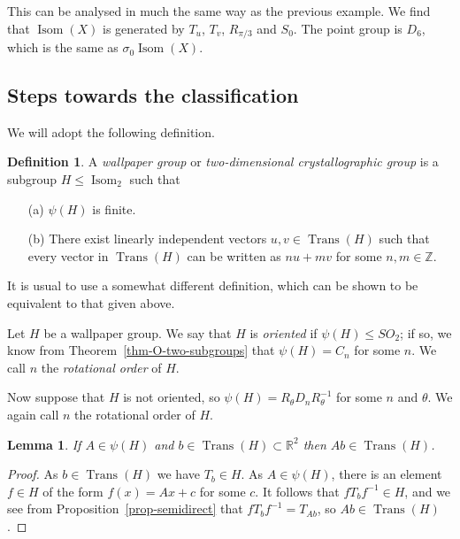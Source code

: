 \documentclass{amsart}
\DeclareMathOperator{\Trans}    {Trans}
\DeclareMathOperator{\Isom}     {Isom}
\newcommand{\Z}         {{\mathbb{Z}}}
\newcommand{\R}         {{\mathbb{R}}}
\newcommand{\sg}        {\sigma}
\renewcommand{\:}{\colon}
\newtheorem{lemma}[theorem]{Lemma}
\theoremstyle{definition}
\newtheorem{definition}[theorem]{Definition}
\begin{document}
This can be analysed in much the same way as the previous example.  We
find that $\Isom(X)$ is generated by $T_u$, $T_v$, $R_{\pi/3}$ and $S_0$.
The point group is $D_6$, which is the same as $\sg_0\Isom(X)$.

\subsection{Steps towards the classification}

We will adopt the following definition.
\begin{definition}\label{defn-wallpaper}
 A \emph{wallpaper group} or \emph{two-dimensional crystallographic
 group} is a subgroup $H\leq \Isom_2$ such that
 \begin{itemize}
  \item[(a)] $\psi(H)$ is finite.
  \item[(b)] There exist linearly independent vectors $u,v\in \Trans(H)$
   such that every vector in $\Trans(H)$ can be written as $nu+mv$ for some
   $n,m\in\Z$.
 \end{itemize}
\end{definition}
It is usual to use a somewhat different definition, which can be shown
to be equivalent to that given above.

Let $H$ be a wallpaper group.  We say that $H$ is \emph{oriented} if
$\psi(H)\leq SO_2$; if so, we know from
Theorem~\ref{thm-O-two-subgroups} that $\psi(H)=C_n$ for some $n$.  We
call $n$ the \emph{rotational order} of $H$.

Now suppose that $H$ is not oriented, so
$\psi(H)=R_\theta D_n R_\theta^{-1}$ for some $n$ and $\theta$.  We again
call $n$ the rotational order of $H$.

\begin{lemma}\label{lem-psi-T}
 If $A\in\psi(H)$ and $b\in \Trans(H)\subset\R^2$ then $Ab\in \Trans(H)$.
\end{lemma}
\begin{proof}
 As $b\in \Trans(H)$ we have $T_b\in H$.  As $A\in\psi(H)$, there is an
 element $f\in H$ of the form $f(x)=Ax+c$ for some $c$.  It follows
 that $fT_bf^{-1}\in H$, and we see from
 Proposition~\ref{prop-semidirect} that $fT_bf^{-1}=T_{Ab}$, so
 $Ab\in \Trans(H)$.
\end{proof}
\end{document}
